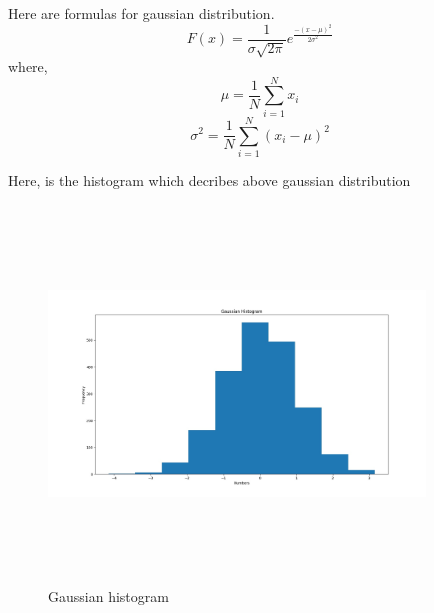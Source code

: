 \documentclass[12pt]{article}
\begin{document}
Here are formulas for gaussian distribution.
\begin{equation}
	F (x) = \frac{1}{\sigma \sqrt {2\pi}}e^{\frac{ - \left( {x - \mu } \right)^2}{2\sigma^2}}
\end{equation}
where,
\begin{equation}
	\mu = \frac{1}{N}\sum_{i = 1}^{N}x_i
\end{equation}
\begin{equation}
	\sigma^2 = \frac{1}{N}\sum_{i=1}^{N}(x_i - \mu)^2
\end{equation}

Here, is the histogram which decribes above gaussian distribution
\begin{figure}[H]
\centering
	\includegraphics[height=10cm,width=10cm]{image_3.jpg}
	\caption{Gaussian histogram}
	\label{Gaussian histogram}
\end{figure}
\end{document}
